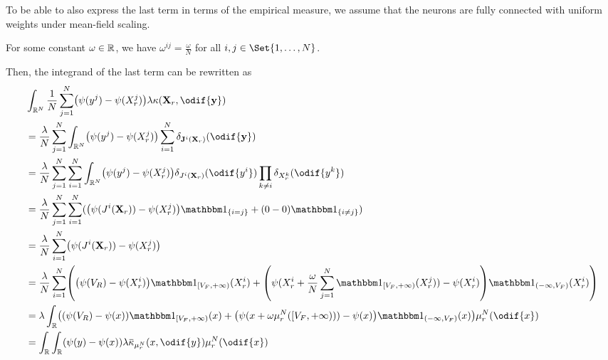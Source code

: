 To be able to also express the last term in terms of the empirical measure, we assume that the neurons are fully connected with uniform weights under mean-field scaling. %
\begin{assumption}
  For some constant \( \omega \in \mathbb{R} \), we have \(\omega^{ij} = \frac{\omega}{N}\) for all \( i, j \in \Set{1,\dots,N} \).
\end{assumption}
Then, the integrand of the last term can be rewritten as
\begin{equation}\label{eq:kappa-to-mean-kappa}
  \begin{split}
     & \int_{\potspace^N} \frac{1}{N} \sum_{j=1}^N \br*{ \psi(y^j) - \psi(X_{r}^j) } \lambda \kappa(\bm{X}_r, \odif{\bm{y}})                                                                  \\
     & = \frac{\lambda}{N} \sum_{j=1}^N \int_{\potspace^N} \br*{ \psi(y^j) - \psi(X_{r}^j) } \sum_{i=1}^N \delta_{\bm{\jtarg}^i(\bm{X}_r)}(\odif{\bm{y}})                                     \\
     & = \frac{\lambda}{N} \sum_{j=1}^N \sum_{i=1}^N \int_{\potspace^N} \br*{ \psi(y^j) - \psi(X_{r}^j) } \delta_{\jtarg^i(\bm{X}_r)}(\odif{y^i}) \prod_{k \neq i} \delta_{X_r^k}(\odif{y^k}) \\
     & = \frac{\lambda}{N} \sum_{j=1}^N \sum_{i=1}^N \br{ \br*{ \psi(\jtarg^i(\bm{X}_r)) - \psi(X_{r}^j) } \ind{i = j} + (0 - 0) \ind{i \neq j} }                                             \\
     & = \frac{\lambda}{N} \sum_{i=1}^N \br*{ \psi(\jtarg^i(\bm{X}_r)) - \psi(X_{r}^j) }                                                                                                      \\
     & = \frac{\lambda}{N} \sum_{i=1}^N \br*{ \br*{ \psi(V_R) - \psi(X_{r}^i) } \indE{[V_F,+\infty)}(X_{r}^i)
    + \br*{ \psi(X_{r}^i + \frac{\omega}{N} \sum_{j=1}^N \indE{[V_F,+\infty)}(X_{r}^j)) - \psi(X_{r}^i) } \indE{(-\infty,V_F)}(X_{r}^i) }                                                     \\
     & = \lambda \int_\potspace \br*{ \br*{ \psi(V_R) - \psi(x) } \indE{[V_F,+\infty)}(x)
    + \br*{ \psi(x + \omega \mu_r^N([V_F,+\infty))) - \psi(x) } \indE{(-\infty,V_F)}(x) } \mu_{r}^N(\odif{x})                                                                                 \\
     & = \int_\potspace \int_\potspace (\psi(y) - \psi(x)) \lambda \ol{\kappa}_{\mu_{r}^N}(x, \odif{y}) \mu_{r}^N(\odif{x})
  \end{split}
\end{equation}
